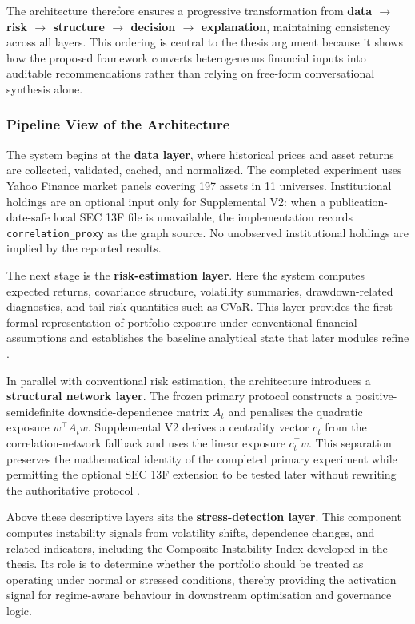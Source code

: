 \documentclass[11pt]{article}
\begin{document}
The architecture therefore ensures a progressive transformation from \textbf{data $\rightarrow$ risk $\rightarrow$ structure $\rightarrow$ decision $\rightarrow$ explanation}, maintaining consistency across all layers. This ordering is central to the thesis argument because it shows how the proposed framework converts heterogeneous financial inputs into auditable recommendations rather than relying on free-form conversational synthesis alone.

\subsubsection{Pipeline View of the Architecture}
The system begins at the \textbf{data layer}, where historical prices and asset returns are collected, validated, cached, and normalized. The completed experiment uses Yahoo Finance market panels covering 197 assets in 11 universes. Institutional holdings are an optional input only for Supplemental V2: when a publication-date-safe local SEC 13F file is unavailable, the implementation records \texttt{correlation\_proxy} as the graph source. No unobserved institutional holdings are implied by the reported results.

The next stage is the \textbf{risk-estimation layer}. Here the system computes expected returns, covariance structure, volatility summaries, drawdown-related diagnostics, and tail-risk quantities such as CVaR. This layer provides the first formal representation of portfolio exposure under conventional financial assumptions and establishes the baseline analytical state that later modules refine \cite{markowitz1952,rockafellar2000,rockafellar2002}.

In parallel with conventional risk estimation, the architecture introduces a \textbf{structural network layer}. The frozen primary protocol constructs a positive-semidefinite downside-dependence matrix $A_t$ and penalises the quadratic exposure $w^{\top}A_t w$. Supplemental V2 derives a centrality vector $c_t$ from the correlation-network fallback and uses the linear exposure $c_t^{\top}w$. This separation preserves the mathematical identity of the completed primary experiment while permitting the optional SEC 13F extension to be tested later without rewriting the authoritative protocol \cite{mantegna1999,peralta2016,wang2024}.

Above these descriptive layers sits the \textbf{stress-detection layer}. This component computes instability signals from volatility shifts, dependence changes, and related indicators, including the Composite Instability Index developed in the thesis. Its role is to determine whether the portfolio should be treated as operating under normal or stressed conditions, thereby providing the activation signal for regime-aware behaviour in downstream optimisation and governance logic.
\end{document}
